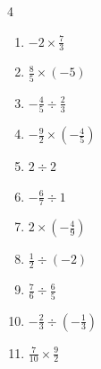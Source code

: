 \begin{multicols}{4}
\begin{enumerate}
  \item $\displaystyle -2\times{}\frac{7}{3}$


\columnbreak %

\resetques

  \item $\displaystyle \frac{8}{5}\times{}\left(-5\right)$

        \phantom{$\displaystyle =-8$}

  \item $\displaystyle -\frac{4}{5}\div{}\frac{2}{3}$


  \item $\displaystyle -\frac{9}{2}\times{}\left(-\frac{4}{5}\right)$


  \item $\displaystyle 2\div{}2$

        \phantom{$\displaystyle =1$}

  \item $\displaystyle -\frac{6}{7}\div{}1$


  \item $\displaystyle 2\times{}\left(-\frac{4}{9}\right)$


  \item $\displaystyle \frac{1}{2}\div{}\left(-2\right)$


  \item $\displaystyle \frac{7}{6}\div{}\frac{6}{5}$


  \item $\displaystyle -\frac{2}{3}\div{}\left(-\frac{1}{3}\right)$

        \phantom{$\displaystyle =2$}

  \item $\displaystyle \frac{7}{10}\times{}\frac{9}{2}$


\columnbreak %


\end{enumerate}
\end{multicols}
